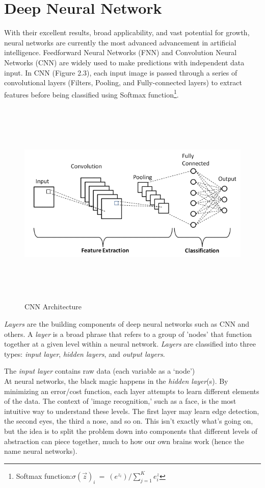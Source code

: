 \section{Deep Neural Network}
\label{sec:deep_neural_network}
With their excellent results, broad applicability, and vast potential for growth, neural networks are currently the most advanced advancement in artificial intelligence.
Feedforward Neural Networks (FNN) and Convolution Neural Networks (CNN) are widely used to make predictions with independent data input. In CNN (Figure 2.3), each input image is passed through a series of convolutional layers (Filters, Pooling, and Fully-connected layers) to extract features before being classified using Softmax function\footnote{Softmax function:$ \sigma (\overrightarrow{z})_i \: = \: (e^{z_i})/ \sum_{j=1}^{K} e^z_i  $}.
\begin{figure}[h!]
	\centering
	\includegraphics[width=\linewidth, height=10cm,keepaspectratio]{figures/CNN.png}
	\caption{CNN Architecture}
\end{figure}	

\emph{Layers} are the building components of deep neural networks such as CNN and others. A \emph{layer} is a broad phrase that refers to a group of 'nodes' that function together at a given level within a neural network. \emph{Layers} are classified into three types: \emph{input layer},\emph{ hidden layers}, and \emph{output layers}.

The \emph{input layer} contains raw data (each variable as a ‘node’) \\
At neural networks, the black magic happens in the \emph{hidden layer}(s). By minimizing an error/cost function, each layer attempts to learn different elements of the data. The context of 'image recognition,' such as a face, is the most intuitive way to understand these levels. The first layer may learn edge detection, the second eyes, the third a nose, and so on. This isn't exactly what's going on, but the idea is to split the problem down into components that different levels of abstraction can piece together, much to how our own brains work (hence the name neural networks).

